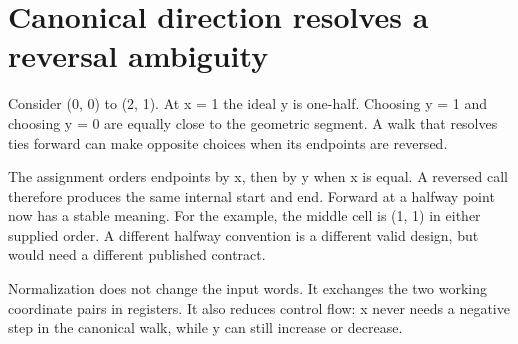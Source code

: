 \section{Canonical direction resolves a reversal
  ambiguity}\label{007-bresenham-line-p02-canonical-direction-resolves-a-reversal-ambiguity}

Consider (0, 0) to (2, 1). At x = 1 the ideal y is one-half. Choosing y
= 1 and choosing y = 0 are equally close to the geometric segment. A
walk that resolves ties forward can make opposite choices when its
endpoints are reversed.

The assignment orders endpoints by x, then by y when x is equal. A
reversed call therefore produces the same internal start and end.
Forward at a halfway point now has a stable meaning. For the example,
the middle cell is (1, 1) in either supplied order. A different halfway
convention is a different valid design, but would need a different
published contract.

Normalization does not change the input words. It exchanges the two
working coordinate pairs in registers. It also reduces control flow: x
never needs a negative step in the canonical walk, while y can still
increase or decrease.
